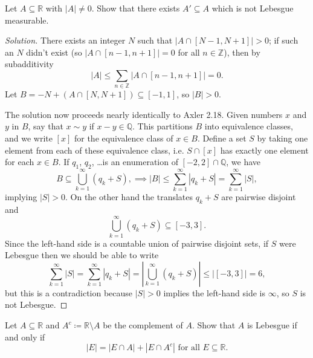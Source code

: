 \documentclass[10pt]{article}
\providecommand{\QQ}{\mathbb Q}
\providecommand{\RR}{\mathbb R}
\providecommand{\ZZ}{\mathbb Z}
\newenvironment{soln}{\begin{proof}[Solution]}{\end{proof}}
\providecommand{\abs}[1]{\left|#1\right|}
\begin{document}

\begin{problem}
    Let $A\subseteq\RR$ with $\abs A\ne 0$.
    Show that there exists $A'\subseteq A$ which is not Lebesgue measurable.
\end{problem}

\begin{soln}
    There exists an integer $N$ such that $\abs{A\cap[N-1,N+1]} > 0$;
    if such an $N$ didn't exist (so $\abs{A\cap [n-1,n+1]} = 0$ for all $n\in\ZZ$),
    then by subadditivity
    \begin{equation*}
	\abs A \le \sum_{n\in\ZZ} \abs{A\cap [n-1,n+1]} = 0.
    \end{equation*}
    Let $B = -N + (A\cap[N,N+1])\subseteq [-1,1]$, so $\abs B > 0$.

    The solution now proceeds nearly identically to Axler 2.18.
    Given numbers $x$ and $y$ in $B$, say that $x\sim y$ if $x-y\in\QQ$.
    This partitions $B$ into equivalence classes, and we write $[x]$
    for the equivalence class of $x\in B$.
    Define a set $S$ by taking one element
    from each of these equivalence class, i.e. $S\cap [x]$ has
    exactly one element for each $x\in B$.
    If $q_1$, $q_2$, \dots is an enumeration of $[-2,2]\cap\QQ$, we have
    \begin{equation*}
	B\subseteq \bigcup_{k=1}^\infty(q_k + S),
	\implies
	\abs B \le \sum_{k=1}^\infty \abs{q_k+S} = \sum_{k=1}^\infty \abs S,
    \end{equation*}
    implying $\abs S > 0$.
    On the other hand the translates $q_k + S$ are pairwise disjoint and
    \begin{equation*}
	\bigcup_{k=1}^\infty (q_k+S) \subseteq [-3,3].
    \end{equation*}
    Since the left-hand side is a countable union of pairwise disjoint sets,
    if $S$ were Lebesgue then we should be able to write
    \begin{equation*}
	\sum_{k=1}^\infty \abs S = \sum_{k=1}^\infty \abs{q_k+S}
	= \abs{\bigcup_{k=1}^\infty (q_k+S)} \le \abs{[-3,3]} = 6,
    \end{equation*}
    but this is a contradiction because $\abs S > 0$ implies
    the left-hand side is $\infty$, so $S$ is not Lebesgue.
\end{soln}

\pagebreak

\begin{problem}
    Let $A\subseteq\RR$ and $A^c\coloneq\RR\setminus A$
    be the complement of $A$. Show that $A$ is Lebesgue if and only if
    \begin{equation*}
	\abs E = \abs{E\cap A} + \abs{E \cap A^c} \text{ for all }E\subseteq\RR.
    \end{equation*}
\end{problem}
\end{document}
